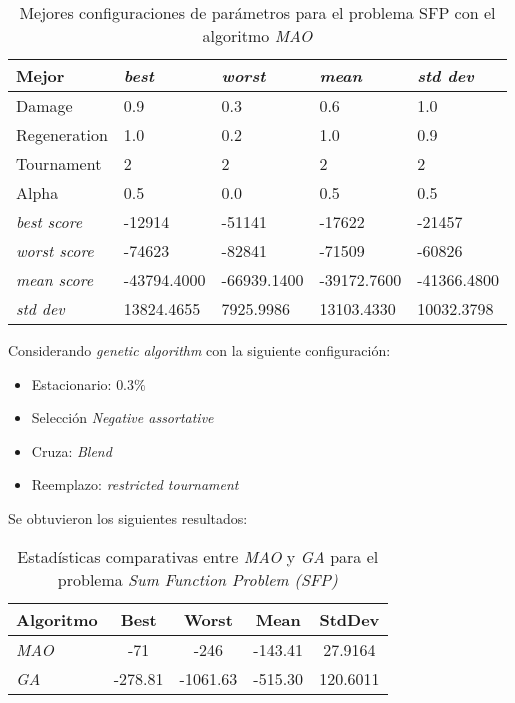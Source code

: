 \begin{table}[h!]
	\centering
	\begin{tabular}{|p{}|p{}|p{}|p{}|p{}|}
		\hline
		\textbf{Mejor} & \textbf{\textit{best}} & \textbf{\textit{worst}} & \textbf{\textit{mean}} & \textbf{\textit{std dev}}  \\ \hline
		
		Damage & 0.9 & 0.3 & 0.6 & 1.0 \\
		Regeneration & 1.0 & 0.2 & 1.0 & 0.9 \\
		Tournament & 2 & 2 & 2 & 2 \\
		Alpha & 0.5 & 0.0 & 0.5 & 0.5 \\ \hline
		
		\textit{best score} & -12914 & -51141 & -17622 & -21457 \\
		\textit{worst score} & -74623 & -82841 & -71509 & -60826 \\
		\textit{mean score} & -43794.4000 & -66939.1400 & -39172.7600 & -41366.4800 \\
		\textit{std dev} & 13824.4655 & 7925.9986 & 13103.4330 & 10032.3798 \\ \hline
	\end{tabular}
	\caption{Mejores configuraciones de parámetros para el problema SFP con el algoritmo \textit{MAO}}
	\label{tab:res_sfp}
\end{table}

Considerando \textit{genetic algorithm} con la siguiente configuración:
\begin{itemize}[nosep]
	\item Estacionario: $0.3\%$
	\item Selección \textit{Negative assortative}
	\item Cruza: \textit{Blend}
	\item Reemplazo: \textit{restricted tournament}
\end{itemize}

Se obtuvieron los siguientes resultados:
\begin{table}[h!]
	\centering
	\begin{tabular}{|l|c|c|c|c|}
		\hline
		\textbf{Algoritmo} & \textbf{Best} & \textbf{Worst} & \textbf{Mean} & \textbf{StdDev} \\
		\hline
		\textit{MAO} & -71 & -246 & -143.41 & 27.9164 \\
		\textit{GA}  & -278.81 & -1061.63 & -515.30 & 120.6011 \\
		\hline
	\end{tabular}
	\caption{Estadísticas comparativas entre \textit{MAO} y \textit{GA} para el problema \textit{Sum Function Problem (SFP)}}
	\label{tab:mao-ga-sfp}
\end{table}

